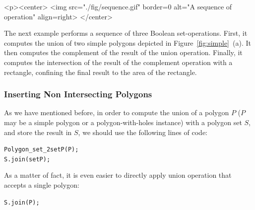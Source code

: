 \lcTex{%
  \setlength{\widthRight}{2.3cm}
  \setlength{\widthLeft}{\widthLineReal}
  \addtolength{\widthLeft}{-\widthRight}
  \begin{minipage}{\widthLeft}
}
\label{fig:sequence}
\begin{ccHtmlOnly}
  <p><center>
    <img src="./fig/sequence.gif" border=0 alt="A sequence of operation" align=right>
  </center>
\end{ccHtmlOnly}
The next example performs a sequence of three Boolean set-operations.
First, it computes the union of two simple polygons depicted in
Figure~\ref{fig:simple}~(a). It then computes the complement of the result
of the union operation. Finally, it computes the intersection of the result
of the complement operation with a rectangle, confining the final result to 
the area of the rectangle.


\subsubsection{Inserting Non Intersecting Polygons}
\label{bops_ssec:insert_ni}

As we have mentioned before, in order to compute the union of a polygon $P$
($P$ may be a simple polygon or a polygon-with-holes instance)
with a polygon set $S$, and store the result in $S$, we should use the
following lines of code:
\begin{alltt}
  Polygon_set_2  setP (P);
  S.join (setP);
\end{alltt}
As a matter of fact, it is even easier to directly apply union operation
that accepts a single polygon:
\begin{alltt}
  S.join (P);
\end{alltt}

